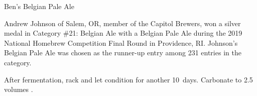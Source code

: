 \stylesection{\stylebelgianpaleale}

\begin{recipie}{Ben's Belgian Pale Ale}

\begin{aboutblock}
Andrew Johnson of Salem, OR, member of the Capitol Brewers, won a silver medal in
Category \#21: Belgian Ale with a Belgian Pale Ale during the 2019 National Homebrew
Competition Final Round in Providence, RI. Johnson's Belgian Pale Ale was chosen as
the runner-up entry among 231 entries in the category.
\end{aboutblock}


\begin{methodandtiming}
 
\begin{mashsteps}
\end{mashsteps}

\begin{fermentationsteps}
\end{fermentationsteps}

\begin{directions}
After fermentation, rack and let condition for another 10~days. Carbonate to 2.5
volumes .
\end{directions}

\end{methodandtiming}

\pagebreak

\begin{ingredientsblock}

\begin{malts}
\end{malts}

\begin{hops}
\end{hops}

\begin{yeasts}
\end{yeasts}

\end{ingredientsblock}

\end{recipie}
